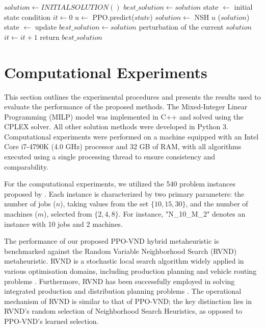 \documentclass{article}
\begin{document}
\begin{algorithm}[h]
\caption{PPO - VND\label{alg:PPO-VND}}
\begin{algorithmic}[1]
    \State $solution \leftarrow INITIAL SOLUTION()$
    \State $best\_solution \gets solution$ 
    \State state $\leftarrow$ initial state condition 
    \State $it \leftarrow 0$ 
        \State $u \leftarrow $ PPO.predict($state$) 
        \State $solution \leftarrow $ NSH $u$ ($solution$) 
        \State state $\leftarrow$ update
            \State $best\_solution \gets solution$
        \Else
            \State perturbation of the current $solution$
        \EndIf
        \State $it \gets it + 1$
    \EndWhile
    \State return $best\_solution$
\end{algorithmic}
\end{algorithm}

\section{Computational Experiments} %
\label{sec:ComputationalExperiments}

This section outlines the experimental procedures and presents the results used to evaluate the performance of the proposed methods. The Mixed-Integer Linear Programming (MILP) model was implemented in C++ and solved using the CPLEX solver. All other solution methods were developed in Python 3. Computational experiments were performed on a machine equipped with an Intel Core i7-4790K (4.0 GHz) processor and 32 GB of RAM, with all algorithms executed using a single processing thread to ensure consistency and comparability.

For the computational experiments, we utilized the 540 problem instances proposed by \cite{de2022heuristics}. Each instance is characterized by two primary parameters: the number of jobs ($n$), taking values from the set $\{10, 15, 30\}$, and the number of machines ($m$), selected from $\{2, 4, 8\}$. For instance, "N\_10\_M\_2" denotes an instance with 10 jobs and 2 machines.

The performance of our proposed PPO-VND hybrid metaheuristic is benchmarked against the Random Variable Neighborhood Search (RVND) metaheuristic. RVND is a stochastic local search algorithm \citep{hansen2001variable} widely applied in various optimisation domains, including production planning \citep{haddad2014aiv, yildiz2023variable} and vehicle routing problems \citep{subramanian2013hybrid, penna2013iterated}. Furthermore, RVND has been successfully employed in solving integrated production and distribution planning problems \citep{Arroyo_felix}. The operational mechanism of RVND is similar to that of PPO-VND; the key distinction lies in RVND's random selection of Neighborhood Search Heuristics, as opposed to PPO-VND's learned selection.
\end{document}
